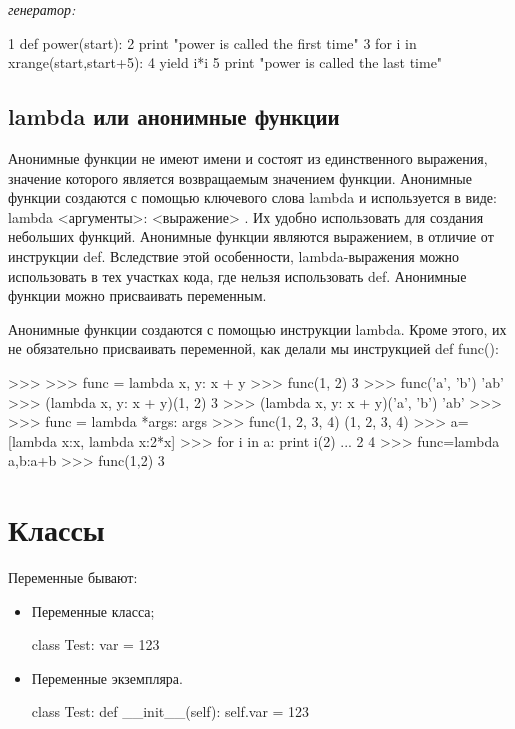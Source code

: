 \textit{генератор:}
\begin{python}
1 def power(start):
2     print "power is called the first time"
3     for i in xrange(start,start+5):
4         yield i*i
5     print "power is called the last time"
\end{python}

\subsection{lambda или анонимные функции}		

Анонимные функции не имеют имени и состоят из единственного выражения, значение которого является возвращаемым значением функции. Анонимные функции создаются с помощью ключевого слова lambda и используется в виде: lambda <аргументы>: <выражение> . Их удобно использовать для создания небольших функций. Анонимные функции являются выражением, в отличие от инструкции def. Вследствие этой особенности, lambda-выражения можно использовать в тех участках кода, где нельзя использовать def. Анонимные функции можно присваивать переменным.

Анонимные функции создаются с помощью инструкции lambda. Кроме этого, их не обязательно присваивать переменной, как делали мы инструкцией def func():
\begin{python}
>>>
>>> func = lambda x, y: x + y
>>> func(1, 2)
3
>>> func('a', 'b')
'ab'
>>> (lambda x, y: x + y)(1, 2)
3
>>> (lambda x, y: x + y)('a', 'b')
'ab'
>>>
>>> func = lambda *args: args
>>> func(1, 2, 3, 4)
(1, 2, 3, 4)
>>> a=[lambda x:x, lambda x:2*x]
>>> for i in a: print i(2)
... 
2
4
>>> func=lambda a,b:a+b
>>> func(1,2)
3	
\end{python}

\section{Классы}

Переменные бывают:
\begin{itemize}
    \item Переменные класса;
    \begin{python}
    class Test:
        var = 123
    \end{python}
    \item Переменные экземпляра.
    \begin{python}
    class Test:
        def __init__(self):
            self.var = 123
    \end{python}
\end{itemize}

